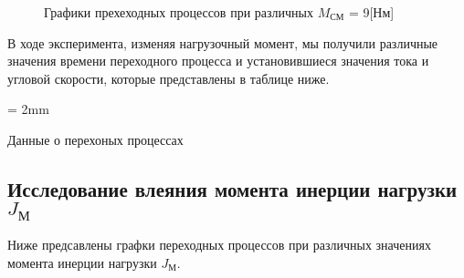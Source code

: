 \documentclass[a4paper, 12pt]{article}
\begin{document}
\begin{figure}[h!]
\begin{subfigure}{0.5\textwidth}
		\end{subfigure}
		\caption{Графики прехеходных процессов при различных $M_\text{СМ}$ = 9[Нм]}
	\end{figure}
	\newpage
	В ходе эксперимента, изменяя нагрузочный момент, мы получили различные значения времени переходного процесса и установившиеся значения тока и угловой скорости, которые представлены в таблице ниже.
	
	\begin{table}[h!]
		\tabulinesep = 2mm
		\centering
		\begin{threeparttable}
			\caption{Данные о перехоных процессах}
		\end{threeparttable}
	\end{table}
	
	\newpage
	\begin{center}
		\section{Исследование влеяния момента инерции нагрузки $J_\text{М}$}
	\end{center}
	\par Ниже предсавлены графки переходных процессов при различных значениях момента инерции нагрузки $J_\text{М}$.
	
\end{document}
